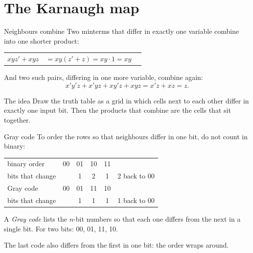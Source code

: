 \documentclass[10pt]{wosm-slides}
\makeatletter
\newenvironment{derivation}
  {\begin{tabular}{@{}r@{\;}l@{\qquad}l@{}}}
  {\end{tabular}}
\newcommand*\by[1]{\wosmlabel{#1}}
\makeatother
\begin{document}
\section{The Karnaugh map}

\begin{frame}{Neighbours combine}
  Two minterms that differ in exactly one variable combine into one shorter
  product:

  \medskip
  \small
  \begin{derivation}
    $xyz' + xyz$ & $= xy(z' + z) = xy \cdot 1 = xy$
      & \by{distributivity, complement, identity} \\
  \end{derivation}

  \medskip
  \normalsize
  And two such pairs, differing in one more variable, combine again:
  \[ x'y'z + x'yz + xy'z + xyz = x'z + xz = z . \]

  \begin{block}{The idea}
    Draw the truth table as a grid in which cells next to each other differ in
    exactly one input bit. Then the products that combine are the cells that sit
    together.
  \end{block}
\end{frame}

\begin{frame}{Gray code}
  To order the rows so that neighbours differ in one bit, do not count in binary:
  \begin{center}
    \begin{tabular}{@{}lccccc@{}}
      binary order & 00 & 01 & 10 & 11 & \\
      bits that change & & 1 & \alert{2} & 1 & \alert{2} back to 00 \\
      \midrule
      Gray code & 00 & 01 & 11 & 10 & \\
      bits that change & & 1 & 1 & 1 & 1 back to 00 \\
    \end{tabular}
  \end{center}

  \begin{definition}
    A \emph{Gray code} lists the $n$-bit numbers so that each one differs from the
    next in a single bit. For two bits: 00, 01, 11, 10.
  \end{definition}

  The last code also differs from the first in one bit: the order wraps around.
\end{frame}
\end{document}
